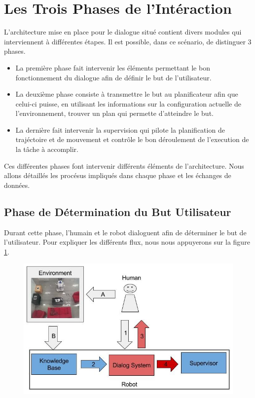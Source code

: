 \documentclass[a4paper,11pt,twoside]{StyleThese}
\begin{document}
\section{Les Trois Phases de l'Intéraction}



L'architecture mise en place pour le dialogue situé contient divers modules qui interviennent à différentes étapes.
Il est possible, dans ce scénario, de distinguer 3 phases. 

\begin{itemize}
\item La première phase fait intervenir les éléments permettant le bon fonctionnement du dialogue afin de définir le but de l'utilisateur.
\item La deuxième phase consiste à transmettre le but au planificateur afin que celui-ci puisse, en utilisant les informations sur la configuration actuelle de l'environnement, trouver un plan qui permette d'atteindre le but. 
\item La dernière fait intervenir la supervision qui pilote la planification de trajéctoire et de mouvement et contrôle le bon déroulement de l'execution de la tâche à accomplir.
\end{itemize}

Ces différentes phases font intervenir différents éléments de l'architecture.
Nous allons détaillés les procésus impliqués dans chaque phase et les échanges de données.

\subsection{Phase de Détermination du But Utilisateur}
Durant cette phase, l'humain et le robot dialoguent afin de déterminer le but de l'utilisateur. Pour expliquer les différents flux, nous nous appuyerons sur la figure \ref{fig:phase1}.




\begin{figure}[ht!]
 \centering
  \includegraphics[width=0.99\linewidth]{./img/phase1color.jpg} 
  \caption {}
  \label{fig:phase1}
\end{figure}
\end{document}
